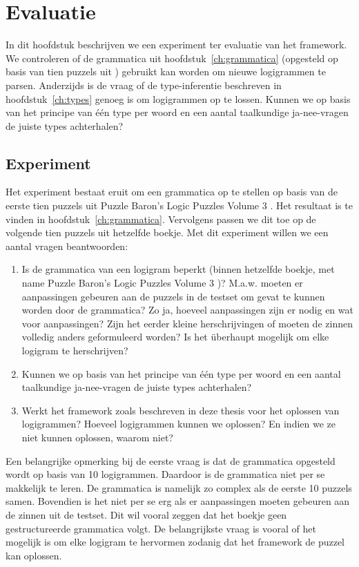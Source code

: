 \chapter{Evaluatie}
\label{ch:evaluatie}

In dit hoofdstuk beschrijven we een experiment ter evaluatie van het framework. We controleren of de grammatica uit hoofdstuk~\ref{ch:grammatica} (opgesteld op basis van tien puzzels uit \cite{logigrammen}) gebruikt kan worden om nieuwe logigrammen te parsen. Anderzijds is de vraag of de type-inferentie beschreven in hoofdstuk~\ref{ch:types} genoeg is om logigrammen op te lossen. Kunnen we op basis van het principe van één type per woord en een aantal taalkundige ja-nee-vragen de juiste types achterhalen?

\section{Experiment}
Het experiment bestaat eruit om een grammatica op te stellen op basis van de eerste tien puzzels uit Puzzle Baron's Logic Puzzles Volume 3 \cite{logigrammen}. Het resultaat is te vinden in hoofdstuk~\ref{ch:grammatica}. Vervolgens passen we dit toe op de volgende tien puzzels uit hetzelfde boekje. Met dit experiment willen we een aantal vragen beantwoorden:

\begin{enumerate}
  \item Is de grammatica van een logigram beperkt (binnen hetzelfde boekje, met name Puzzle Baron's Logic Puzzles Volume 3 \cite{logigrammen})? M.a.w. moeten er aanpassingen gebeuren aan de puzzels in de testset om gevat te kunnen worden door de grammatica? Zo ja, hoeveel aanpassingen zijn er nodig en wat voor aanpassingen? Zijn het eerder kleine herschrijvingen of moeten de zinnen volledig anders geformuleerd worden? Is het überhaupt mogelijk om elke logigram te herschrijven?
  \item Kunnen we op basis van het principe van één type per woord en een aantal taalkundige ja-nee-vragen de juiste types achterhalen?
  \item Werkt het framework zoals beschreven in deze thesis voor het oplossen van logigrammen? Hoeveel logigrammen kunnen we oplossen? En indien we ze niet kunnen oplossen, waarom niet?
\end{enumerate}

Een belangrijke opmerking bij de eerste vraag is dat de grammatica opgesteld wordt op basis van 10 logigrammen. Daardoor is de grammatica niet per se makkelijk te leren. De grammatica is namelijk zo complex als de eerste 10 puzzels samen. Bovendien is het niet per se erg als er aanpassingen moeten gebeuren aan de zinnen uit de testset. Dit wil vooral zeggen dat het boekje geen gestructureerde grammatica volgt. De belangrijkste vraag is vooral of het mogelijk is om elke logigram te hervormen zodanig dat het framework de puzzel kan oplossen.
 
